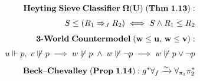 \documentclass[preview]{standalone}
\begin{document}
\begin{align*}
\special{dvisvgm:raw <g id='unique000'>}\mathbf{Heyting\;Sieve\;Classifier\;\Omega(U)\;(Thm\;1.13):}\\[3pt]S \le (R_1 \Rightarrow_J R_2) \;\Longleftrightarrow\; S \wedge R_1 \le R_2\\[4pt]\mathbf{3\text{-}World\;Countermodel\;(w\le u,\, w\le v):}\\[3pt]u\Vdash p,\; v\not\Vdash p \implies w\not\Vdash p \;\wedge\; w\not\Vdash\neg p \implies w\not\Vdash p\vee\neg p\\[4pt]\mathbf{Beck\text{--}Chevalley\;(Prop\;1.14):}\; g^*\forall_f \xrightarrow{\sim} \forall_{\pi_1}\pi_2^*\special{dvisvgm:raw </g>}
\end{align*}
\end{document}
